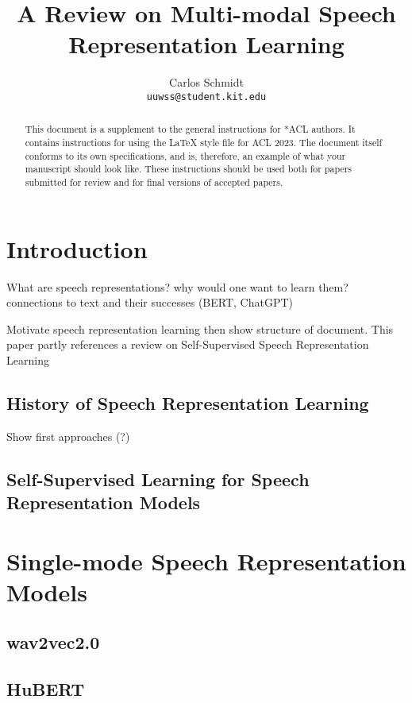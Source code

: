 \documentclass[11pt]{article}
\title{A Review on Multi-modal Speech Representation Learning}
\author{Carlos Schmidt \\\texttt{uuwss@student.kit.edu}\\}
\begin{document}
\maketitle
\begin{abstract}
This document is a supplement to the general instructions for *ACL authors. It contains instructions for using the \LaTeX{} style file for ACL 2023.
The document itself conforms to its own specifications, and is, therefore, an example of what your manuscript should look like.
These instructions should be used both for papers submitted for review and for final versions of accepted papers.
\end{abstract}

\section{Introduction}

What are speech representations? why would one want to learn them? connections to text and their successes (BERT, ChatGPT)

Motivate speech representation learning then show structure of document. This paper partly references a review on Self-Supervised Speech Representation Learning\cite{srl-review}

\subsection{History of Speech Representation Learning}

Show first approaches (?) 

\subsection{Self-Supervised Learning for Speech Representation Models}




\section{Single-mode Speech Representation Models}

\subsection{wav2vec2.0}

\subsection{HuBERT}
\end{document}
